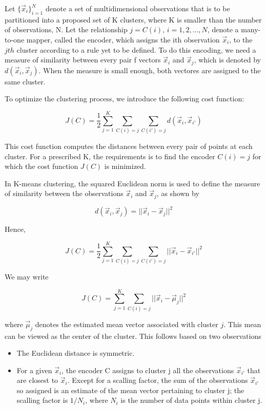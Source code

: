 \documentclass{article}
\begin{document}
Let $ \{ \vec{x}_{i} \}_{i = 1}^{N} $ denote a set of multidimensional observations that is to be partitioned into a proposed set of K clusters, where K is smaller than the number of observations, N. Let the relationship $ j = C(i) $, $ i = 1, 2, \ldots, N $, denote a many-to-one mapper, called the encoder, which assigns the ith observation $ \vec{x}_{i} $, to the $ jth $ cluster according to a rule yet to be defined. To do this encoding, we need a measure of similarity between every pair f vectors $ \vec{x}_{i} $ and $ \vec{x}_{j} $, which is denoted by $ d ( \vec{x}_{i}, \vec{x}_{j}) $. When the measure is small enough, both vectores are assigned to the same cluster.

To optimize the clustering process, we introduce the following cost function:

$$ J (C) = \dfrac{1}{2} \displaystyle\sum_{j = 1}^{K} \displaystyle\sum_{C (i) = j}^{} \displaystyle\sum_{C (i') = j}^{} d ( \vec{x}_{i}, \vec{x}_{i'}) $$

This cost function computes the distances between every pair of points at each cluster. For a prescribed K, the requirements is to find the encoder $ C (i) = j $ for which the cost function $ J (C) $ is minimized.

In K-means clustering, the squared Euclidean norm is used to define the measure of similarity between the observations $ \vec{x}_{i} $ and $ \vec{x}_{j} $, as shown by

$$ d ( \vec{x}_{i}, \vec{x}_{j} ) = || \vec{x}_{i} - \vec{x}_{j}||^{2} $$

Hence,

$$ J (C) = \dfrac{1}{2} \displaystyle\sum_{j = 1}^{K} \displaystyle\sum_{C (i) = j}^{} \displaystyle\sum_{C (i') = j}^{} || \vec{x}_{i} - \vec{x}_{i'}||^{2} $$

We may write

$$ J (C) = \displaystyle\sum_{j = 1}^{K} \displaystyle\sum_{C (i) = j}^{} || \vec{x}_{i} - \vec{\mu}_{j}||^{2} $$

\noindent  where $ \vec{\mu}_{j} $ denotes the estimated mean vector associated with cluster $ j $. This mean can be viewed as the center of the cluster. This follows based on two observations

\begin{itemize}
	\item The Euclidean distance is symmetric.
	\item For a given $ \vec{x}_{i} $, the encoder C assigns to cluster j all the observations $ \vec{x}_{i'} $ that are closest to $ \vec{x}_{i} $. Except for a scalling factor, the sum of the observations $ \vec{x}_{i'} $ so assigned is an estimate of the mean vector pertaining to cluster j; the scalling factor is $ 1 / N_{i} $, where $ N_{i} $ is the number of data points within cluster j.
\end{itemize}
\end{document}
